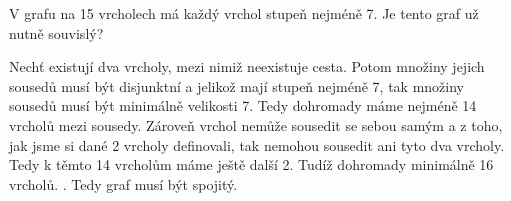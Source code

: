 \documentclass[12pt]{article}					%
\begin{document}
\pagebreak

\begin{priklad}[3]
    V grafu na 15 vrcholech má každý vrchol stupeň nejméně 7. Je tento graf už nutně souvislý?

    \begin{reseni}[Sporem]
        Nechť existují dva vrcholy, mezi nimiž neexistuje cesta. Potom množiny jejich sousedů musí být disjunktní a jelikož mají stupeň nejméně 7, tak množiny sousedů musí být minimálně velikosti 7. Tedy dohromady máme nejméně 14 vrcholů mezi sousedy. Zároveň vrchol nemůže sousedit se sebou samým a z toho, jak jsme si dané 2 vrcholy definovali, tak nemohou sousedit ani tyto dva vrcholy. Tedy k těmto 14 vrcholům máme ještě další 2. Tudíž dohromady minimálně 16 vrcholů. \lightning. Tedy graf musí být spojitý.
    \end{reseni}
\end{priklad}
\end{document}

